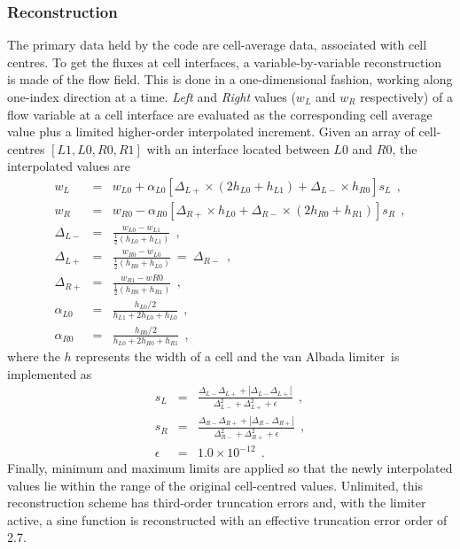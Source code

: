 \subsubsection{Reconstruction}
%
The primary data held by the code are cell-average data, associated with cell centres.
To get the fluxes at cell interfaces, a variable-by-variable reconstruction is made of the flow field.
This is done in a one-dimensional fashion, working along one-index direction at a time.
\textit{Left} and \textit{Right} values ($w_L$ and $w_R$ respectively) of a flow variable at a cell interface
are evaluated as the corresponding cell average value plus a limited higher-order interpolated increment.
Given an array of cell-centres $[L1,L0,R0,R1]$ with an interface located between $L0$ and $R0$, the interpolated
values are
\begin{eqnarray}
  w_L & = & w_{L0} + \alpha_{L0} \left[ \Delta_{L+} \times \left( 2 h_{L0} + h_{L1} \right) + \Delta_{L-} \times h_{R0} \right] s_L ~~, \nonumber \\
  w_R & = & w_{R0} - \alpha_{R0} \left[ \Delta_{R+} \times h_{L0} + \Delta_{R-} \times \left( 2 h_{R0} + h_{R1} \right) \right] s_R ~~, \nonumber \\
  \Delta_{L-} & = & \frac{w_{L0} - w_{L1}}{\frac{1}{2} \left( h_{L0} + h_{L1}\right)} ~~, \nonumber \\
  \Delta_{L+} & = & \frac{w_{R0} - w_{L0}}{\frac{1}{2} \left( h_{R0} + h_{L0} \right)} ~ = ~ \Delta_{R-} ~~, \nonumber \\
  \Delta_{R+} & = & \frac{w_{R1} - w{R0}}{\frac{1}{2} \left( h_{R0} + h_{R1} \right)} ~~, \nonumber \\
  \alpha_{L0}  & = & \frac{h_{L0} / 2}{h_{L1} + 2 h_{L0} + h_{L0}} ~~, \nonumber \\
  \alpha_{R0}  & = & \frac{h_{R0} / 2}{h_{L0} + 2 h_{R0} + h_{R1}} ~~,
\end{eqnarray}
where the $h$ represents the width of a cell and the van Albada limiter\,\cite{vanalbada_etal_81} is implemented as
\begin{eqnarray}
 s_L & = & \frac{\Delta_{L-} \Delta_{L+} + |\Delta_{L-} \Delta_{L+}|}{\Delta_{L-}^2 + \Delta_{L+}^2 + \epsilon} ~~, \nonumber \\
 s_R & = & \frac{\Delta_{R-} \Delta_{R+} + |\Delta_{R-} \Delta_{R+}|}{\Delta_{R-}^2 + \Delta_{R+}^2 + \epsilon} ~~, \nonumber \\
 \epsilon & = & 1.0 \times 10^{-12} ~~. \nonumber
\end{eqnarray}
Finally, minimum and maximum limits are applied so that the newly interpolated values 
lie within the range of the original cell-centred values. 
Unlimited, this reconstruction scheme has third-order truncation errors and, with the limiter active, a sine function
is reconstructed with an effective truncation error order of 2.7.
 
